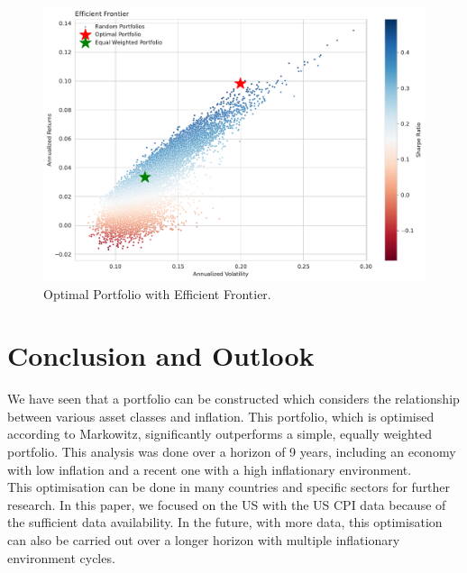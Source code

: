 \documentclass{article}
\begin{document}
\begin{figure}[H]
    \centering
    \includegraphics[width=1\textwidth]{paper/figure/Optimal_PF.pdf}
    \caption{Optimal Portfolio with Efficient Frontier.}
    \label{fig:mesh5}
\end{figure}




\newpage

\section{Conclusion and Outlook}

We have seen that a portfolio can be constructed which considers the relationship between various asset classes and inflation. This portfolio, which is optimised according to Markowitz, significantly outperforms a simple, equally weighted portfolio. This analysis was done over a horizon of 9 years, including an economy with low inflation and a recent one with a high inflationary environment. \\

This optimisation can be done in many countries and specific sectors for further research. In this paper, we focused on the US with the US CPI data because of the sufficient data availability. In the future, with more data, this optimisation can also be carried out over a longer horizon with multiple inflationary environment cycles.
\end{document}
